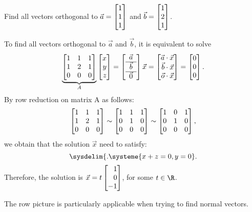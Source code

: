 \begin{example}
	Find all vectors orthogonal to $\vec a=\mat{1\\1\\1}$ and $\vec b=\mat{1\\2\\1}$.

	To find all vectors orthogonal to $\vec a$ and $\vec b$, it is equivalent to solve
	\[
	\underbrace{\mat{1&1&1\\1&2&1\\0&0&0}}_A\mat{x\\y\\z}=
	\left[\begin{array}{c}\vec a\\\hline\vec b\\\hline\vec 0\end{array}\right]\vec x=
	\mat{\vec a\cdot \vec x\\\vec b\cdot\vec x\\\vec o\cdot \vec x}
	     =\mat{0\\0\\0}.
    \]
    By row reduction on matrix A as follows:
    \[
        \mat{1&1&1\\1&2&1\\0&0&0} \sim \mat{1&1&1\\0&1&0\\0&0&0} \sim \mat{1&0&1\\0&1&0\\0&0&0},
    \]
    we obtain that the solution $\vec x$ need to satisfy:
    \begin{equation}
	\sysdelim\{.
		\systeme{
			x+z=0,
			y=0
		}.
    \end{equation}
    Therefore, the solution is $\vec x = t\mat{1\\0\\-1}$, for some $t\in \R$.
	
\end{example}

The row picture is particularly applicable when trying to find normal vectors.

